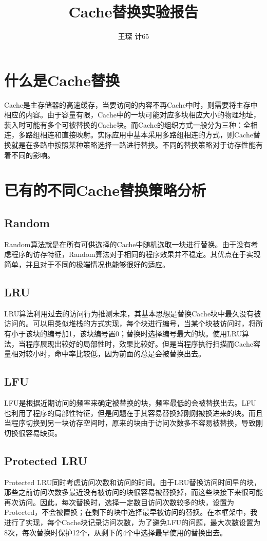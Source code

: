 \documentclass[utf8]{article}
\title{\fontsize{18}\baselineskip Cache替换实验报告}
\author{王琛 \quad 计65 \quad 2016011360}
\date{}
\begin{document}
\maketitle

\section{什么是Cache替换}
Cache是主存储器的高速缓存，当要访问的内容不再Cache中时，则需要将主存中相应的内容。由于容量有限，Cache中的一块可能对应多块相应大小的物理地址，装入时可能有多个可被替换的Cache块。而Cache的组织方式一般分为三种：全相连，多路组相连和直接映射。实际应用中基本采用多路组相连的方式，则Cache替换就是在多路中按照某种策略选择一路进行替换。不同的替换策略对于访存性能有着不同的影响。

\section{已有的不同Cache替换策略分析}
\subsection{Random}
Random算法就是在所有可供选择的Cache中随机选取一块进行替换。由于没有考虑程序的访存特征，Random算法对于相同的程序效果并不稳定。其优点在于实现简单，并且对于不同的极端情况也能够很好的适应。

\subsection{LRU}
LRU算法利用过去的访问行为推测未来，其基本思想是替换Cache块中最久没有被访问的。可以用类似堆栈的方式实现，每个块进行编号，当某个块被访问时，将所有小于该块的编号加1，该块编号置0；替换时选择编号最大的块。使用LRU算法，当程序展现出较好的局部性时，效果比较好。但是当程序执行扫描而Cache容量相对较小时，命中率比较低，因为前面的总是会被替换出去。

\subsection{LFU}
LFU是根据近期访问的频率来确定被替换的块，频率最低的会被替换出去。LFU也利用了程序的局部性特征，但是问题在于其容易替换掉刚刚被换进来的块。而且当程序切换到另一块访存空间时，原来的块由于访问次数多不容易被替换，导致刚切换很容易缺页。

\subsection{Protected LRU}
Protected LRU同时考虑访问次数和访问的时间。由于LRU替换访问时间早的块，那些之前访问次数多最近没有被访问的块很容易被替换掉，而这些块接下来很可能再次访问。因此，每次替换时，选择一定数目访问次数较多的块，设置为Protected，不会被置换；在剩下的块中选择最早被访问的替换。在本框架中，我进行了实现，每个Cache块记录访问次数，为了避免LFU的问题，最大次数设置为8次，每次替换时保护12个，从剩下的4个中选择最早使用的替换出去。
\end{document}
